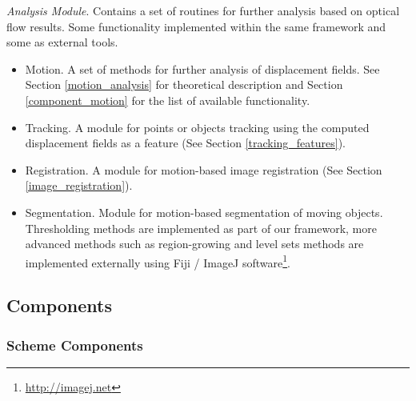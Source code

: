 \textit{Analysis Module}. Contains a set of routines for further analysis based on optical flow results. Some functionality implemented within the same framework and some as external tools.
\begin{itemize}
	\item Motion. A set of methods for further analysis of displacement fields. See Section \ref{motion_analysis} for theoretical description and Section \ref{component_motion} for the list of available functionality. 
	\item Tracking. A module for points or objects tracking using the computed displacement fields as a  feature (See Section \ref{tracking_features}). 
	\item Registration. A module for motion-based image registration (See Section \ref{image_registration}).
	\item Segmentation. Module for motion-based segmentation of moving objects. Thresholding methods are implemented as part of our framework, more advanced methods such as region-growing and level sets methods are implemented externally using Fiji / ImageJ software\footnote{\url{http://imagej.net}}. 
\end{itemize}




\subsection {Components}

%

\subsubsection {Scheme Components}

